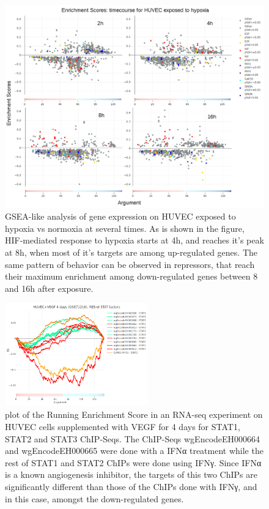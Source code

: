 \documentclass[a4paper, 12pt ]{article}
\begin{document}
\begin{figure}[h]
	\centering
	\includegraphics[width=\textwidth]{graf-tfea2}
	\caption{GSEA-like analysis of gene expression on HUVEC exposed to hypoxia vs normoxia at several times. As is shown in the figure, HIF-mediated response to hypoxia starts at 4h, and reaches it's peak at 8h, when most of it's targets are among up-regulated genes. The same pattern of behavior can be observed in repressors, that reach their maximum enrichment among down-regulated genes between 8 and 16h after exposure.}
\end{figure}

\begin{figure}
	\centering
	\includegraphics[width=0.55\textwidth]{graf-tfea3}
	\caption{plot of the Running Enrichment Score in an RNA-seq experiment on HUVEC cells supplemented with VEGF for 4 days for STAT1, STAT2 and STAT3 ChIP-Seqs.
	The ChIP-Seqs wgEncodeEH000664 and wgEncodeEH000665 were done with a IFNα treatment while the rest of STAT1 and STAT2 ChIPs were done using IFNγ. Since IFNα is a known angiogenesis inhibitor, the targets of this two ChIPs are significantly different than those of the ChIPs done with IFNγ, and in this case, amongst the down-regulated genes.}
\end{figure}	
\end{document}
